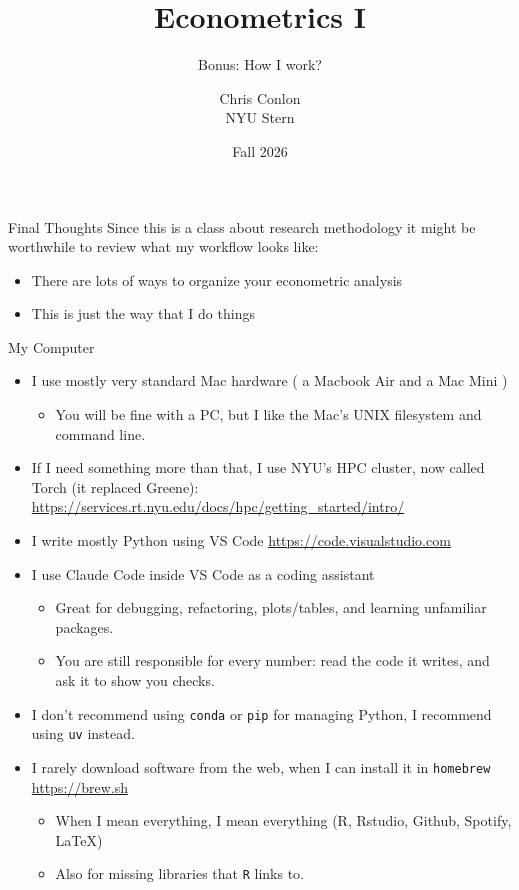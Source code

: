 \documentclass[aspectratio=169,11pt]{beamer}
\begin{document}
\title[Econometrics I]{ Econometrics I}
\subtitle{Bonus: How I work?}
\author{Chris Conlon \\NYU Stern}
\date{Fall 2026}
\maketitle

\begin{frame}{Final Thoughts}
Since this is a class about \alert{research methodology} it might be worthwhile to review what my workflow looks like:

\begin{itemize}
	\item There are lots of ways to organize your econometric analysis
	\item This is just the way that I do things
\end{itemize}
\end{frame}


\begin{frame}{My Computer}
\begin{itemize}
	\item I use mostly very standard Mac hardware ( a Macbook Air and a Mac Mini )
	\begin{itemize}
		\item You will be fine with a PC, but I like the Mac's UNIX filesystem and command line.
	\end{itemize}
	\item If I need something more than that, I use NYU's HPC cluster, now called \alert{Torch} (it replaced Greene):
	\url{https://services.rt.nyu.edu/docs/hpc/getting_started/intro/}
	\item I write mostly Python using VS Code \url{https://code.visualstudio.com}
	\item I use \alert{Claude Code} inside VS Code as a coding assistant
	\begin{itemize}
		\item Great for debugging, refactoring, plots/tables, and learning unfamiliar packages.
		\item You are still responsible for every number: read the code it writes, and ask it to show you checks.
	\end{itemize}
	\item I don't recommend using \texttt{conda} or \texttt{pip} for managing Python, I recommend using \texttt{uv} instead.
	\item I rarely download software from the web, when I can install it in \texttt{homebrew} \url{https://brew.sh}
	\begin{itemize}
		\item When I mean everything, I mean everything (R, Rstudio, Github, Spotify, LaTeX)
		\item Also for missing libraries that \texttt{R} links to.
	\end{itemize}
\end{itemize}
\end{frame}
\end{document}
